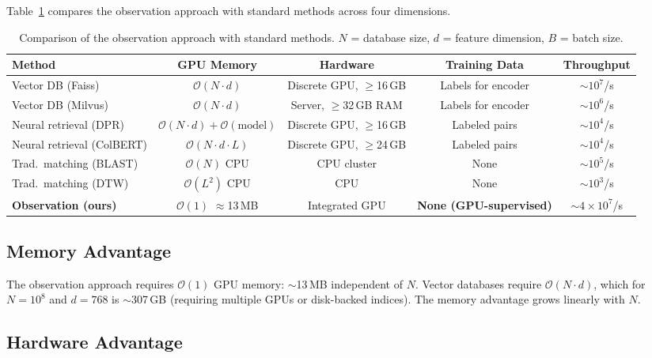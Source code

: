 \documentclass[11pt,twocolumn,a4paper]{article}
\newcommand{\BigO}{\mathcal{O}}
\begin{document}
Table~\ref{tab:comparison} compares the observation approach with
standard methods across four dimensions.

\begin{table}[t]
\centering
\caption{Comparison of the observation approach with standard methods.
$N$ = database size, $d$ = feature dimension, $B$ = batch size.}
\label{tab:comparison}
\begin{tabular}{lcccc}
\toprule
\textbf{Method} &
\textbf{GPU Memory} &
\textbf{Hardware} &
\textbf{Training Data} &
\textbf{Throughput} \\
\midrule
Vector DB (Faiss) \citep{johnson2019}
  & $\BigO(N \cdot d)$
  & Discrete GPU, $\geq$16\,GB
  & Labels for encoder
  & $\sim$$10^7$/s \\
Vector DB (Milvus) \citep{milvus2021}
  & $\BigO(N \cdot d)$
  & Server, $\geq$32\,GB RAM
  & Labels for encoder
  & $\sim$$10^6$/s \\
Neural retrieval (DPR) \citep{karpukhin2020}
  & $\BigO(N \cdot d) + \BigO(\text{model})$
  & Discrete GPU, $\geq$16\,GB
  & Labeled pairs
  & $\sim$$10^4$/s \\
Neural retrieval (ColBERT) \citep{khattab2020}
  & $\BigO(N \cdot d \cdot L)$
  & Discrete GPU, $\geq$24\,GB
  & Labeled pairs
  & $\sim$$10^4$/s \\
Trad.\ matching (BLAST) \citep{altschul1990}
  & $\BigO(N)$ CPU
  & CPU cluster
  & None
  & $\sim$$10^5$/s \\
Trad.\ matching (DTW) \citep{sakoe1978}
  & $\BigO(L^2)$ CPU
  & CPU
  & None
  & $\sim$$10^3$/s \\
\midrule
\textbf{Observation (ours)}
  & $\BigO(1)$ $\approx$13\,MB
  & Integrated GPU
  & \textbf{None (GPU-supervised)}
  & $\sim$$4 \times 10^7$/s \\
\bottomrule
\end{tabular}
\end{table}

\subsection{Memory Advantage}

The observation approach requires $\BigO(1)$ GPU memory: $\sim$13\,MB
independent of $N$. Vector databases require $\BigO(N \cdot d)$,
which for $N = 10^8$ and $d = 768$ is $\sim$307\,GB (requiring
multiple GPUs or disk-backed indices). The memory advantage grows
linearly with $N$.

\subsection{Hardware Advantage}
\end{document}
